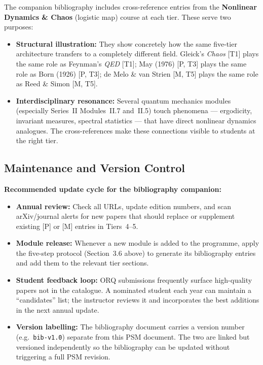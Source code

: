 \documentclass[11pt,a4paper]{article}
\begin{document}
The companion bibliography includes cross-reference entries from the
\textbf{Nonlinear Dynamics \& Chaos} (logistic map) course at each tier.
These serve two purposes:

\begin{itemize}[leftmargin=1.8em,itemsep=3pt]
  \item \textbf{Structural illustration:} They show concretely how the same
        five-tier architecture transfers to a completely different field.
        Gleick's \textit{Chaos} [T1] plays the same role as Feynman's \textit{QED} [T1];
        May (1976) [P, T3] plays the same role as Born (1926) [P, T3];
        de Melo \& van Strien [M, T5] plays the same role as Reed \& Simon [M, T5].

  \item \textbf{Interdisciplinary resonance:} Several quantum mechanics modules
        (especially Series~II Modules~II.7 and~II.5) touch phenomena --- ergodicity,
        invariant measures, spectral statistics --- that have direct nonlinear
        dynamics analogues. The cross-references make these connections visible
        to students at the right tier.
\end{itemize}

\subsection{Maintenance and Version Control}

\begin{tcolorbox}[goldbox]
\textbf{Recommended update cycle for the bibliography companion:}

\medskip
\begin{itemize}[leftmargin=1.5em,itemsep=4pt]
  \item \textbf{Annual review:} Check all URLs, update edition numbers, and scan
        arXiv/journal alerts for new papers that should replace or supplement
        existing [P] or [M] entries in Tiers~4--5.

  \item \textbf{Module release:} Whenever a new module is added to the programme,
        apply the five-step protocol (Section~3.6 above) to generate its
        bibliography entries and add them to the relevant tier sections.

  \item \textbf{Student feedback loop:} ORQ submissions frequently surface
        high-quality papers not in the catalogue. A nominated student each year
        can maintain a ``candidates'' list; the instructor reviews it and incorporates
        the best additions in the next annual update.

  \item \textbf{Version labelling:} The bibliography document carries a version
        number (e.g.\ \texttt{bib-v1.0}) separate from this PSM document. The
        two are linked but versioned independently so the bibliography can be
        updated without triggering a full PSM revision.
\end{itemize}
\end{tcolorbox}

\end{document}
